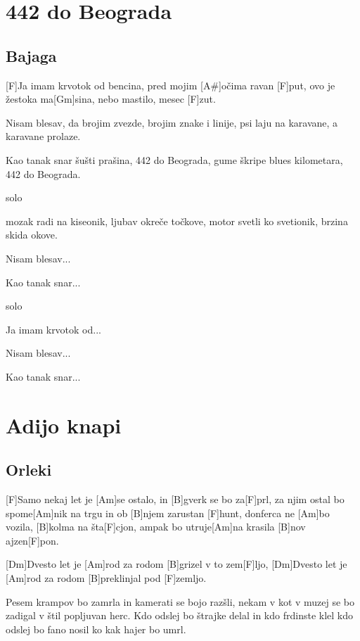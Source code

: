 \documentclass[a4paper,12pt]{article}
\begin{document}
\begin{multicols}{2}
\section{442 do Beograda}
\subsection*{Bajaga}
\begin{guitar}
[F A# 	F  Gm Gm F 2x]

[F]Ja imam krvotok od bencina,
pred mojim [A#]očima ravan [F]put,
ovo je žestoka ma[Gm]sina,
nebo mastilo, mesec [F]zut.

Nisam blesav, da brojim zvezde,
brojim znake i linije,
psi laju na karavane,
a karavane prolaze.

Kao tanak snar šušti prašina,
442 do Beograda,
gume škripe blues kilometara,
442 do Beograda.

solo

mozak radi na kiseonik,
ljubav okreče točkove,
motor svetli ko svetionik,
brzina skida okove.

Nisam blesav...

Kao tanak snar...

solo

Ja imam krvotok od...

Nisam blesav...

Kao tanak snar... 
\end{guitar}
\section{Adijo knapi}
\subsection*{Orleki}
\begin{guitar}
[F Am B F]

[F]Samo nekaj let je [Am]se ostalo,
in [B]gverk se bo za[F]prl,
za njim ostal bo spome[Am]nik na trgu
in ob [B]njem zarustan [F]hunt,
donferca ne [Am]bo vozila,
[B]kolma na šta[F]cjon,
ampak bo utruje[Am]na krasila
[B]nov ajzen[F]pon.


[Dm]Dvesto let je [Am]rod za rodom [B]grizel v to zem[F]ljo,
[Dm]Dvesto let je [Am]rod za rodom 
[B]preklinjal pod [F]zemljo.


Pesem krampov bo zamrla
in kamerati se bojo razšli,
nekam v kot v muzej se bo zadigal
v štil popljuvan herc.
Kdo odslej bo štrajke delal
in kdo frdinste klel
kdo odslej bo fano nosil
ko kak hajer bo umrl.



\end{guitar}
\end{multicols}
\end{document}
